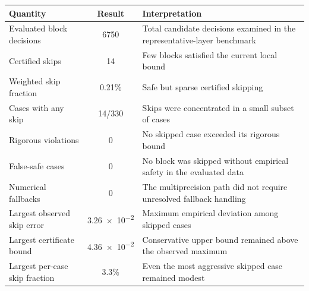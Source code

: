 \begin{threeparttable}
\begin{tabularx}{\linewidth}{@{}l c X@{}}
\toprule
Quantity & Result & Interpretation \\
\midrule
Evaluated block decisions & \num{6750} & Total candidate decisions examined in the representative-layer benchmark \\
Certified skips & \num{14} & Few blocks satisfied the current local bound \\
Weighted skip fraction & \num{0.21}\% & Safe but sparse certified skipping \\
Cases with any skip & \num{14}/\num{330} & Skips were concentrated in a small subset of cases \\
Rigorous violations & \num{0} & No skipped case exceeded its rigorous bound \\
False-safe cases & \num{0} & No block was skipped without empirical safety in the evaluated data \\
Numerical fallbacks & \num{0} & The multiprecision path did not require unresolved fallback handling \\
Largest observed skip error & \num{3.26e-2} & Maximum empirical deviation among skipped cases \\
Largest certificate bound & \num{4.36e-2} & Conservative upper bound remained above the observed maximum \\
Largest per-case skip fraction & \num{3.3}\% & Even the most aggressive skipped case remained modest \\
\bottomrule
\end{tabularx}
\end{threeparttable}
